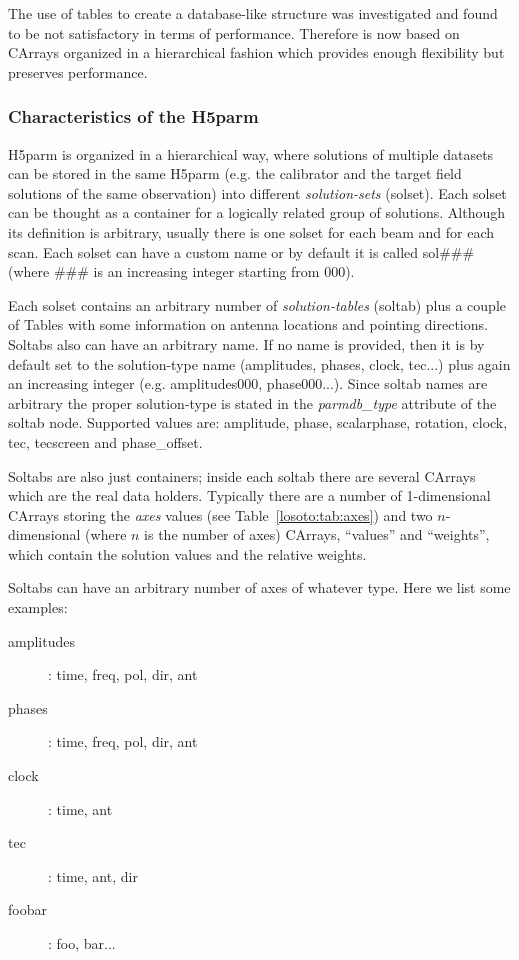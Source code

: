 The use of tables to create a database-like structure was investigated and found to be not satisfactory in terms of performance. Therefore \losoto{} is now based on CArrays organized in a hierarchical fashion which provides enough flexibility but preserves performance.

\subsubsection{Characteristics of the H5parm}
\label{losoto:characteristics_h5parm}

H5parm is organized in a hierarchical way, where solutions of multiple datasets can be stored in the same H5parm (e.g. the calibrator and the target field solutions of the same observation) into different \textit{solution-sets} (solset). Each solset can be thought as a container for a logically related group of solutions. Although its definition is arbitrary, usually there is one solset for each beam and for each scan. Each solset can have a custom name or by default it is called sol\#\#\# (where \#\#\# is an increasing integer starting from 000).

Each solset contains an arbitrary number of \textit{solution-tables} (soltab) plus a couple of Tables with some information on antenna locations and pointing directions. Soltabs also can have an arbitrary name. If no name is provided, then it is by default set to the solution-type name (amplitudes, phases, clock, tec...) plus again an increasing integer (e.g. amplitudes000, phase000...). Since soltab names are arbitrary the proper solution-type is stated in the \textit{parmdb\_type} attribute of the soltab node. Supported values are: amplitude, phase, scalarphase, rotation, clock, tec, tecscreen and phase\_offset.

Soltabs are also just containers; inside each soltab there are several CArrays which are the real data holders. Typically there are a number of 1-dimensional CArrays storing the \textit{axes} values (see Table~\ref{losoto:tab:axes}) and two $n$-dimensional (where $n$ is the number of axes) CArrays, ``values'' and ``weights'', which contain the solution values and the relative weights.

Soltabs can have an arbitrary number of axes of whatever type. Here we list some examples:
\begin{description}
 \item[amplitudes]: time, freq, pol, dir, ant
 \item[phases]: time, freq, pol, dir, ant
 \item[clock]: time, ant
 \item[tec]: time, ant, dir
 \item[foobar]: foo, bar...
\end{description}

